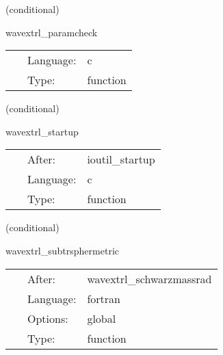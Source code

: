    (conditional) 

\hspace{5mm} wavextrl\_paramcheck 

\hspace{5mm}{\it check parameters for waveextract } 


\hspace{5mm}

 \begin{tabular*}{160mm}{cll} 
~ & Language:  & c \\ 
~ & Type:  & function \\ 
\end{tabular*} 


\vspace{5mm}

   (conditional) 

\hspace{5mm} wavextrl\_startup 

\hspace{5mm}{\it register waveextract as an io method } 


\hspace{5mm}

 \begin{tabular*}{160mm}{cll} 
~ & After:  & ioutil\_startup \\ 
~ & Language:  & c \\ 
~ & Type:  & function \\ 
\end{tabular*} 


\vspace{5mm}

   (conditional) 

\hspace{5mm} wavextrl\_subtrsphermetric 

\hspace{5mm}{\it substract spherical background part of metric from metric } 


\hspace{5mm}

 \begin{tabular*}{160mm}{cll} 
~ & After:  & wavextrl\_schwarzmassrad \\ 
~ & Language:  & fortran \\ 
~ & Options:  & global \\ 
~ & Type:  & function \\ 
\end{tabular*} 



